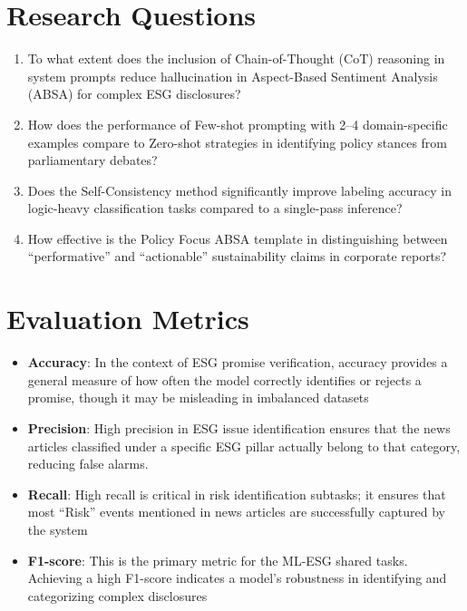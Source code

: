 \documentclass{article}
\begin{document}
\section{Research Questions}
\begin{enumerate}
\item To what extent does the inclusion of Chain-of-Thought (CoT) reasoning in system prompts reduce hallucination in Aspect-Based Sentiment Analysis (ABSA) for complex ESG disclosures?
\item How does the performance of Few-shot prompting with 2--4 domain-specific examples compare to Zero-shot strategies in identifying policy stances from parliamentary debates?
\item Does the Self-Consistency method significantly improve labeling accuracy in logic-heavy classification tasks compared to a single-pass inference?
\item How effective is the Policy Focus ABSA template in distinguishing between ``performative'' and ``actionable'' sustainability claims in corporate reports?
\end{enumerate}

\section{Evaluation Metrics}
\begin{itemize}
\item \textbf{Accuracy}: In the context of ESG promise verification, accuracy provides a general measure of how often the model correctly identifies or rejects a promise, though it may be misleading in imbalanced datasets 
\item \textbf{Precision}: High precision in ESG issue identification ensures that the news articles classified under a specific ESG pillar actually belong to that category, reducing false alarms.
\item \textbf{Recall}: High recall is critical in risk identification subtasks; it ensures that most ``Risk'' events mentioned in news articles are successfully captured by the system 
\item \textbf{F1-score}: This is the primary metric for the ML-ESG shared tasks. Achieving a high F1-score indicates a model's robustness in identifying and categorizing complex disclosures 
\end{itemize}
\end{document}
